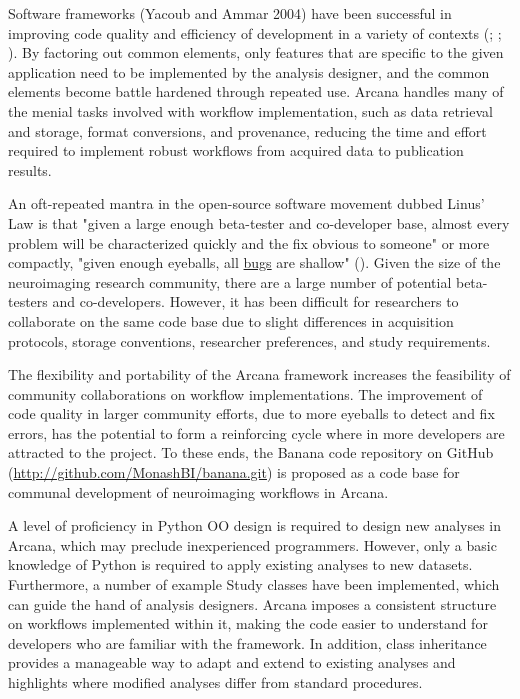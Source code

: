 Software frameworks (Yacoub and Ammar 2004) have been successful in
improving code quality and efficiency of development in a variety of
contexts (\cite{moore_professional_2008}; \cite{white_hadoop:_2012}; \cite{abadi_tensorflow:_2016}). By
factoring out common elements, only features that are specific to the
given application need to be implemented by the analysis designer, and
the common elements become battle hardened through repeated use. Arcana
handles many of the menial tasks involved with workflow implementation,
such as data retrieval and storage, format conversions, and provenance,
reducing the time and effort required to implement robust workflows from
acquired data to publication results.

An oft-repeated mantra in the open-source software movement dubbed
Linus' Law is that "given a large enough beta-tester and co-developer
base, almost every problem will be characterized quickly and the fix
obvious to someone" or more compactly, "given enough eyeballs, all
\href{https://en.wikipedia.org/wiki/Software_bug}{bugs} are shallow"
(\cite{raymond_cathedral_1999}). Given the size of the neuroimaging research community,
there are a large number of potential beta-testers and co-developers.
However, it has been difficult for researchers to collaborate on the
same code base due to slight differences in acquisition protocols,
storage conventions, researcher preferences, and study requirements.

The flexibility and portability of the Arcana framework increases the
feasibility of community collaborations on workflow implementations. The
improvement of code quality in larger community efforts, due to more
eyeballs to detect and fix errors, has the potential to form a
reinforcing cycle where in more developers are attracted to the project.
To these ends, the Banana code repository on GitHub
(\url{http://github.com/MonashBI/banana.git}) is proposed as a code base
for communal development of neuroimaging workflows in Arcana.

A level of proficiency in Python OO design is required to design new
analyses in Arcana, which may preclude inexperienced programmers.
However, only a basic knowledge of Python is required to apply existing
analyses to new datasets. Furthermore, a number of example Study classes
have been implemented, which can guide the hand of analysis designers.
Arcana imposes a consistent structure on workflows implemented within
it, making the code easier to understand for developers who are familiar
with the framework. In addition, class inheritance provides a manageable
way to adapt and extend to existing analyses and highlights where
modified analyses differ from standard procedures.

